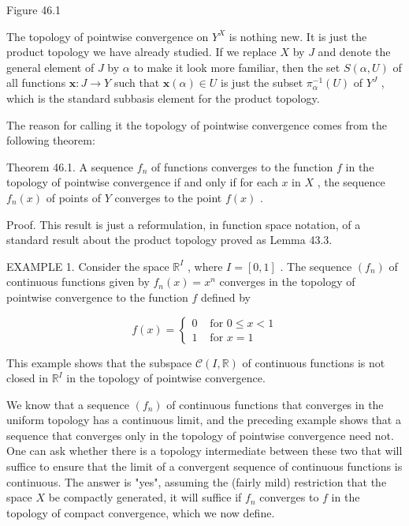 Figure 46.1

The topology of pointwise convergence on \({Y}^{X}\) is nothing new. It is just the product topology we have already studied. If we replace \(X\) by \(J\) and denote the general element of \(J\) by \(\alpha\) to make it look more familiar, then the set \(S\left( {\alpha ,U}\right)\) of all functions \(\mathbf{x} : J \rightarrow  Y\) such that \(\mathbf{x}\left( \alpha \right)  \in  U\) is just the subset \({\pi }_{\alpha }^{-1}\left( U\right)\) of \({Y}^{J}\) , which is the standard subbasis element for the product topology.

The reason for calling it the topology of pointwise convergence comes from the following theorem:

Theorem 46.1. A sequence \({f}_{n}\) of functions converges to the function \(f\) in the topology of pointwise convergence if and only if for each \(x\) in \(X\) , the sequence \({f}_{n}\left( x\right)\) of points of \(Y\) converges to the point \(f\left( x\right)\) .

Proof. This result is just a reformulation, in function space notation, of a standard result about the product topology proved as Lemma 43.3.

EXAMPLE 1. Consider the space \({\mathbb{R}}^{I}\) , where \(I = \left\lbrack  {0,1}\right\rbrack\) . The sequence \(\left( {f}_{n}\right)\) of continuous functions given by \({f}_{n}\left( x\right)  = {x}^{n}\) converges in the topology of pointwise convergence to the function \(f\) defined by

\[
f\left( x\right)  = \left\{  \begin{array}{ll} 0 & \text{ for }0 \leq  x < 1 \\  1 & \text{ for }x = 1 \end{array}\right.
\]

This example shows that the subspace \(\mathcal{C}\left( {I,\mathbb{R}}\right)\) of continuous functions is not closed in \({\mathbb{R}}^{I}\) in the topology of pointwise convergence.

We know that a sequence \(\left( {f}_{n}\right)\) of continuous functions that converges in the uniform topology has a continuous limit, and the preceding example shows that a sequence that converges only in the topology of pointwise convergence need not. One can ask whether there is a topology intermediate between these two that will suffice to ensure that the limit of a convergent sequence of continuous functions is continuous. The answer is "yes", assuming the (fairly mild) restriction that the space \(X\) be compactly generated, it will suffice if \({f}_{n}\) converges to \(f\) in the topology of compact convergence, which we now define.

